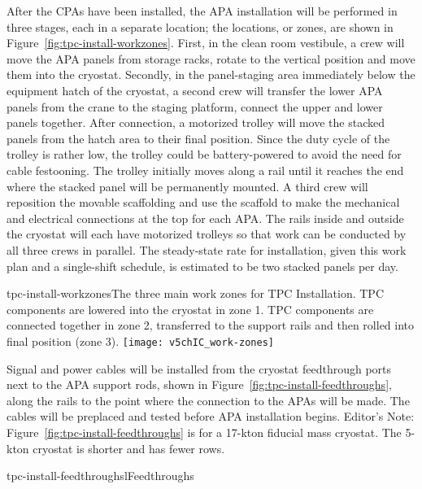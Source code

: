 After the CPAs have been installed, the APA installation will be performed in three stages, each in a separate location; the locations, or zones, are shown in Figure~\ref{fig:tpc-install-workzones}. First, in the clean room vestibule, a crew will move the APA panels from storage 
racks, rotate to the vertical position and move them into the cryostat. Secondly, in the panel-staging area immediately below the equipment hatch of the cryostat, a second crew will transfer the lower APA panels from the 
crane to the staging platform, connect the upper and lower panels together. After connection, a motorized trolley will move the stacked panels from the hatch area to their final position. Since the duty cycle of the trolley is rather low, the trolley could be battery-powered to 
avoid the need for cable festooning. The trolley initially moves along a rail until it reaches the end where the stacked panel will be permanently mounted. A third 
crew will reposition the movable scaffolding and use the scaffold to make the mechanical and electrical connections at the top for each APA. The rails inside and outside 
the cryostat will each have motorized trolleys so that work can be conducted by all three crews in parallel. The steady-state rate for installation, given this work plan and a single-shift schedule, is estimated to be two stacked panels per day. 

\begin{cdrfigure}{tpc-install-workzones}{The three main work zones for TPC Installation. TPC components are lowered into the cryostat in zone 1. TPC components are connected together in zone 2, 
transferred to the support rails and then rolled into final position (zone 3).}
\texttt{[image: v5chIC\_work-zones]}
\end{cdrfigure}

Signal and power cables will be installed from the cryostat feedthrough ports next to the APA support rods, shown in Figure~\ref{fig:tpc-install-feedthroughs}, along the rails to the point where the connection to the APAs will be made. The cables will be 
preplaced and tested before APA installation begins.  Editor’s Note: Figure~\ref{fig:tpc-install-feedthroughs} is for a 17-kton fiducial mass cryostat. The 5-kton cryostat is shorter and has fewer rows.  

\begin{cdrfigure}[Feedthroughs]{tpc-install-feedthroughs}{lFeedthroughs}
\end{cdrfigure}


